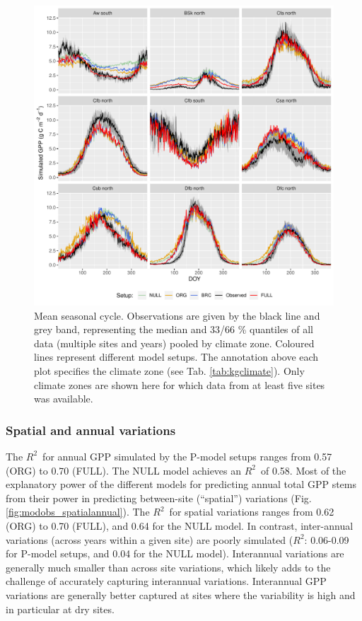 \documentclass[gmd, manuscript]{copernicus}
\newcommand{\rsq}{$R^2$}
\begin{document}
 \begin{figure}[!ht]
\includegraphics[width=\textwidth]{fig/meandoy_byzone.pdf}
\caption{Mean seasonal cycle. Observations are given by the black line and grey band, representing the median and 33/66 \% quantiles of all data (multiple sites and years) pooled by climate zone. Coloured lines represent different model setups. The annotation above each plot specifies the climate zone (see Tab. \ref{tab:kgclimate}). Only climate zones are shown here for which data from at least five sites was available.}
    \label{fig:season}
\end{figure}

\clearpage


\subsubsection{Spatial and annual variations}

The \rsq\ for annual GPP simulated by the P-model setups ranges from 0.57 (ORG) to 0.70 (FULL). The NULL model achieves an \rsq\ of 0.58. Most of the explanatory power of the different models for predicting annual total GPP stems from their power in predicting between-site (``spatial'') variations (Fig. \ref{fig:modobs_spatialannual}). The \rsq\ for spatial variations ranges from 0.62 (ORG) to 0.70 (FULL), and 0.64 for the NULL model. In contrast, inter-annual  variations (across years within a given site) are poorly simulated (\rsq : 0.06-0.09 for P-model setups, and 0.04 for the NULL model). Interannual variations are generally much smaller than across site variations, which likely adds to the challenge of accurately capturing interannual variations. Interannual GPP variations are generally better captured at sites where the variability is high and in particular at dry sites. 
\end{document}
